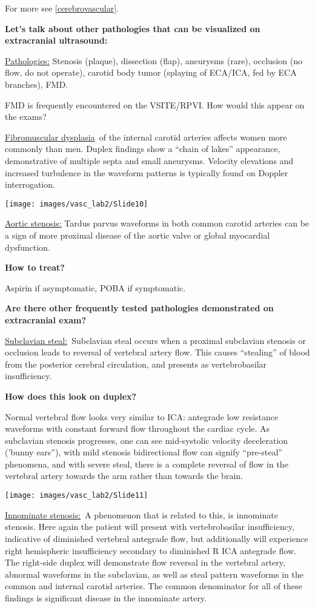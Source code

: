 \documentclass[
]{book}
\begin{document}
For more see \ref{cerebrovascular}.

\textbf{Let's talk about other pathologies that can be visualized on
extracranial ultrasound:}

\uline{Pathologies:} Stenosis (plaque), dissection (flap),
aneurysms (rare), occlusion (no flow, do not operate), carotid body
tumor (splaying of ECA/ICA, fed by ECA branches), FMD.

FMD is frequently encountered on the VSITE/RPVI. How would this appear
on the exams?

\uline{Fibromuscular dysplasia}~of the internal carotid arteries
affects women more commonly than men. Duplex findings show a ``chain of
lakes'' appearance, demonstrative of multiple septa and small aneurysms.
Velocity elevations and increased turbulence in the waveform patterns is
typically found on Doppler interrogation.\citep{olin2012}

\texttt{[image: images/vasc\_lab2/Slide10]}

\uline{Aortic stenosis:} Tardus parvus waveforms in both common
carotid arteries can be a sign of more proximal disease of the aortic
valve or global myocardial dysfunction.

\textbf{How to treat?}

Aspirin if asymptomatic, POBA if symptomatic.

\textbf{Are there other frequently tested pathologies demonstrated on
extracranial exam?}

\uline{Subclavian steal:}~Subclavian steal occurs when a proximal
subclavian stenosis or occlusion leads to reversal of vertebral artery
flow. This causes ``stealing'' of blood from the posterior cerebral
circulation, and presents as vertebrobasilar insufficiency.

\textbf{How does this look on duplex?}

Normal vertebral flow looks very similar to ICA: antegrade low
resistance waveforms with constant forward flow throughout the cardiac
cycle. As subclavian stenosis progresses, one can see mid-systolic
velocity deceleration ('bunny ears''), with mild stenosis bidirectional
flow can signify ``pre-steal'' phenomena, and with severe steal, there is
a complete reversal of flow in the vertebral artery towards the arm
rather than towards the brain.\citep{kalaria2005, mousa2017}

\texttt{[image: images/vasc\_lab2/Slide11]}

\uline{Innominate stenosis:}~A phenomenon that is related to this,
is innominate stenosis. Here again the patient will present with
vertebrobasilar insufficiency, indicative of diminished vertebral
antegrade flow, but additionally will experience right hemispheric
insufficiency secondary to diminished R ICA antegrade flow. The
right-side duplex will demonstrate flow reversal in the vertebral
artery, abnormal waveforms in the subclavian, as well as steal pattern
waveforms in the common and internal carotid arteries. The common
denominator for all of these findings is significant disease in the
innominate artery.
\end{document}
